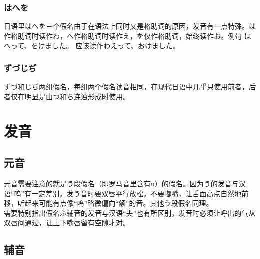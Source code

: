 \documentclass[12pt, a4paper, oneside]{book}
\newcommand{\jp}{\CJKfamily{zj}}
\begin{document}
\subsection{はへを}
日语里はへを三个假名由于在语法上同时又是格助词的原因，发音有一点特殊。は作格助词时读作わ，へ作格助词时读作え，を仅作格助词，始终读作お。例句
{\jp {}はへって、をけました。}
应该读作{\jp {}わえって、おけました。}
\subsection{ずづじぢ}
ずづ和じぢ两组假名，每组两个假名读音相同，在现代日语中几乎只使用前者，后者仅在明显是由つ和ち连浊形成时使用。

\chapter{发音}\label{chap:prn}
\section{元音}
元音需要注意的就是う段假名（即罗马音里含有u）的假名。因为う的发音与汉语“呜”有一定差别，发う音时要双唇平行放松，不要嘟嘴，让舌面高点自然地前移，听起来可能有点像“呜”略微偏向“额”的音。其他う段假名同理。\\
需要特别指出假名ふ辅音的发音与汉语“夫”也有所区别，发音时必须让呼出的气从双唇间通过，让上下嘴唇留有空隙才对。
\section{辅音}
\end{document}
